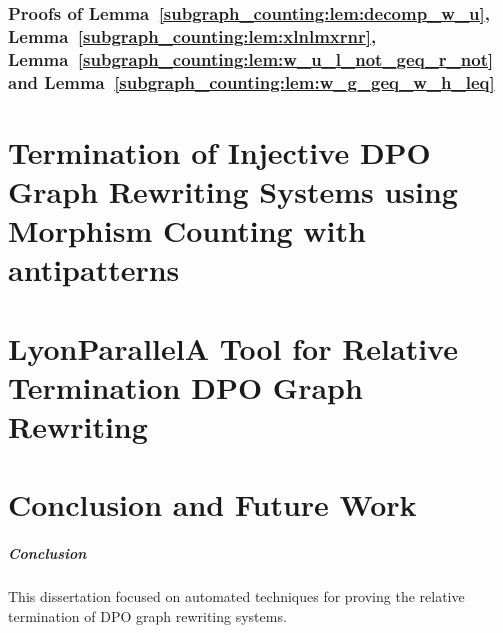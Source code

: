 \documentclass{report}
\begin{document}
\subsection*{Proofs of Lemma~\ref{subgraph_counting:lem:decomp_w_u}, Lemma~\ref{subgraph_counting:lem:xlnlmxrnr}, Lemma~\ref{subgraph_counting:lem:w_u_l_not_geq_r_not} and Lemma~\ref{subgraph_counting:lem:w_g_geq_w_h_leq}}
\label{subgraph_counting:sec:appendix:a}




\chapter{Termination of Injective DPO Graph Rewriting
Systems using Morphism Counting with antipatterns}
\label{chap:antipattern}
 


 
\chapter{LyonParallel\textemdash A Tool for Relative Termination DPO Graph Rewriting} 
\label{chap:lyonparallel}

\chapter{Conclusion and Future Work}
\paragraph{Conclusion}
This dissertation focused on automated techniques for proving the relative termination of DPO graph rewriting systems.
\end{document}
